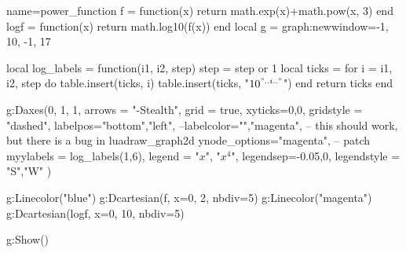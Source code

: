 \documentclass{standalone}
\begin{document}
\begin{luadraw}{name=power_function}
   f = function(x) 
       return math.exp(x)+math.pow(x, 3) 
   end
   logf = function(x) 
       return math.log10(f(x)) 
   end
   local g = graph:new{window={-1, 10, -1, 17}}  
   
   local log_labels = function(i1, i2, step)
       step = step or 1
       local ticks = {}
       for i = i1, i2, step do
           table.insert(ticks, i)
           table.insert(ticks, "$10^{"..i.."}$")
       end
       return ticks
   end

   g:Daxes({0, 1, 1}, {
       arrows = "-Stealth", 
       grid = true, 
       xyticks={0,0},
       gridstyle = "dashed",
       labelpos={"bottom","left"}, 
       --labelcolor={"","magenta"}, -- this should work, but there is a bug in luadraw_graph2d
       ynode_options="magenta", -- patch 
       myylabels = log_labels(1,6), 
       legend = {"$x$", "$x^4$"},
       legendsep={-0.05,0},
       legendstyle = {"S","W"}
   })

   g:Linecolor("blue")
   g:Dcartesian(f, {x={0, 2}, nbdiv=5})
   g:Linecolor("magenta")
   g:Dcartesian(logf, {x={0, 10}, nbdiv=5})

   g:Show()
\end{luadraw}
\end{document}
